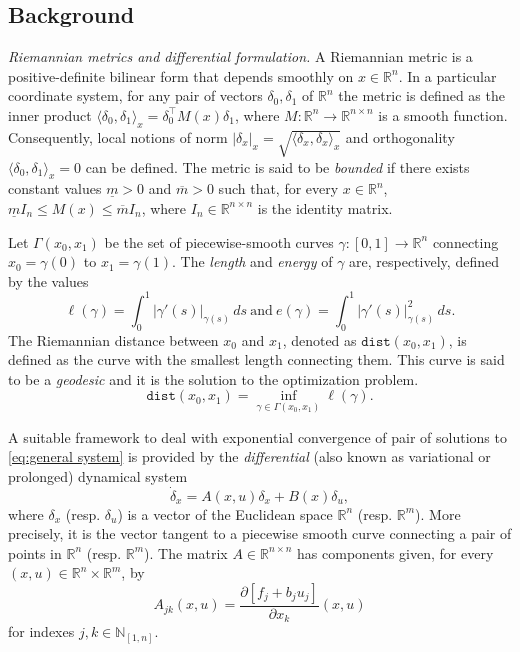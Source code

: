 \documentclass[10pt,twocolumn,twoside]{IEEEtran}
\theoremstyle{plain}
\theoremstyle{definition}
\theoremstyle{remark}
\begin{document}
\subsection{Background}

{\itshape Riemannian metrics and differential formulation.} A Riemannian metric is a positive-definite bilinear form that depends smoothly on $x\in\mathbb{R}^n$. In a particular coordinate system, for any pair of vectors $\delta_0,\delta_1$ of $\mathbb{R}^n$ the metric is defined as the inner product $\langle\delta_0,\delta_{ 1}\rangle_x=\delta_0^\top M(x)\delta_1$, where $M:\mathbb{R}^n\to\mathbb{R}^{n\times n}$ is a smooth function. Consequently, local notions of norm $|\delta_x|_x=\sqrt{\langle\delta_x,\delta_x\rangle_x}$ and orthogonality $\langle\delta_0,\delta_1\rangle_x=0$ can be defined. The metric is said to be \emph{bounded} if there exists constant values $\underline{m}>0$ and $\overline{m}>0$ such that, for every $x\in\mathbb{R}^n$, $\underline{m}I_n\leq M(x)\leq \overline{m}I_n$, where $I_n\in\mathbb{R}^{n\times n}$ is the identity matrix.

Let $\Gamma(x_0,x_1)$ be the set of piecewise-smooth curves $\gamma:[0,1]\to\mathbb{R}^n$ connecting $x_0=\gamma(0)$ to $x_1=\gamma(1)$. The \emph{length} and \emph{energy} of $\gamma$ are, respectively, defined by the values
\begin{equation*}
	\ell(\gamma)=\int_0^1|\gamma'(s)|_{\gamma(s)}\,ds\ \text{and}\ e(\gamma)=\int_0^1|\gamma'(s)|_{\gamma(s)}^2\,ds.
\end{equation*}
The Riemannian distance between $x_0$ and $x_1$, denoted as $\mathbin{\mathtt{dist}}(x_0,x_1)$, is defined as the curve with the smallest length connecting them. This curve is said to be a \emph{geodesic} and it is the solution to the optimization problem.
\begin{equation}\label{eq:geodesic formulation}
	\mathbin{\mathtt{dist}}(x_0,x_1)=\inf_{\gamma\in\Gamma(x_0,x_1)}\ell(\gamma).
\end{equation}

A suitable framework to deal with exponential convergence of pair of solutions to \eqref{eq:general system} is provided by the \emph{differential} (also known as variational or prolonged) dynamical system
\begin{equation}\label{eq:general system:differential}
	\dot{\delta}_x=A(x,u)\delta_x+B(x)\delta_u,
\end{equation}
where $\delta_x$ (resp. $\delta_u$) is a vector of the Euclidean space $\mathbb{R}^n$ (resp. $\mathbb{R}^m$). More precisely, it is the vector tangent to a piecewise smooth curve connecting a pair of points in $\mathbb{R}^n$ (resp. $\mathbb{R}^m$). The matrix $A\in\mathbb{R}^{n\times n}$ has components given, for every $(x,u)\in\mathbb{R}^n\times\mathbb{R}^m$, by 
\begin{equation*}
	A_{jk}(x,u)=\dfrac{\partial[f_j+b_ju_j]}{\partial x_k}(x,u)	
\end{equation*}
for indexes $j,k\in\mathbb{N}_{[1,n]}$. 
\end{document}
